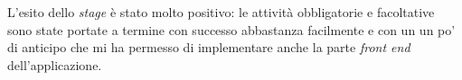 L'esito dello \textit{stage} è stato molto positivo: le attività obbligatorie e facoltative sono state portate a termine con successo abbastanza facilmente 
e con un un po' di anticipo che mi ha permesso di implementare anche la parte \textit{front end} dell'applicazione.

%
%

\endgroup			

\vfill

